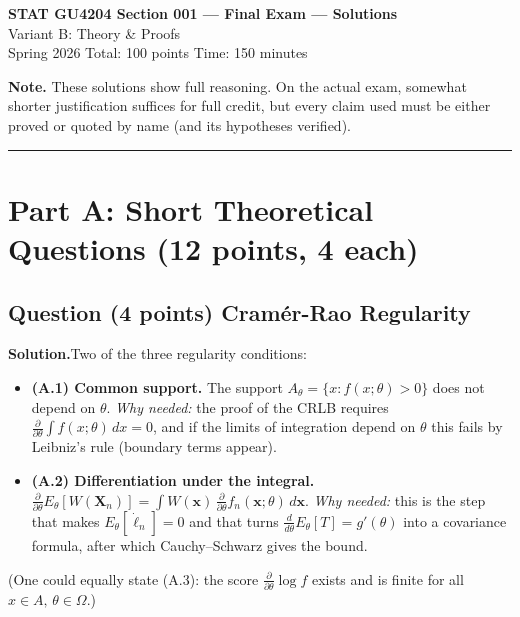 \documentclass[11pt]{article}
\newcounter{qnum}
\newcommand{\question}[2]{\stepcounter{qnum}\subsection*{Question \theqnum \quad (#1 points) \hfill #2}}
\newcommand{\soln}{\medskip\textbf{Solution.}\quad}
\newcommand{\bX}{\mathbf{X}}
\begin{document}
\begin{center}
{\LARGE\bfseries STAT GU4204 Section 001 --- Final Exam --- Solutions}\\[4pt]
{\large Variant B: Theory \& Proofs}\\[6pt]
{\large Spring 2026 \hspace{1.5cm} Total: 100 points \hspace{1.5cm} Time: 150 minutes}\\[4pt]
\end{center}

\medskip

\textbf{Note.} These solutions show full reasoning. On the actual exam, somewhat shorter justification suffices for full credit, but every claim used must be either proved or quoted by name (and its hypotheses verified).

\bigskip
\hrule
\bigskip

\section*{Part A: Short Theoretical Questions \hfill (12 points, 4 each)}

\question{4}{Cram\'er-Rao Regularity}

\soln Two of the three regularity conditions:

\begin{itemize}[leftmargin=2em,nosep]
    \item \textbf{(A.1) Common support.} The support $A_\theta = \{x : f(x;\theta) > 0\}$ does not depend on $\theta$. \emph{Why needed:} the proof of the CRLB requires $\frac{\partial}{\partial\theta}\int f(x;\theta)\,dx = 0$, and if the limits of integration depend on $\theta$ this fails by Leibniz's rule (boundary terms appear).
    \item \textbf{(A.2) Differentiation under the integral.} $\frac{\partial}{\partial\theta} E_\theta[W(\bX_n)] = \int W(\mathbf{x})\,\frac{\partial}{\partial\theta} f_n(\mathbf{x};\theta)\,d\mathbf{x}$. \emph{Why needed:} this is the step that makes $E_\theta[\dot\ell_n] = 0$ and that turns $\frac{d}{d\theta}E_\theta[T] = g'(\theta)$ into a covariance formula, after which Cauchy--Schwarz gives the bound.
\end{itemize}

(One could equally state (A.3): the score $\frac{\partial}{\partial\theta}\log f$ exists and is finite for all $x \in A,\,\theta\in\Omega$.)
\end{document}
